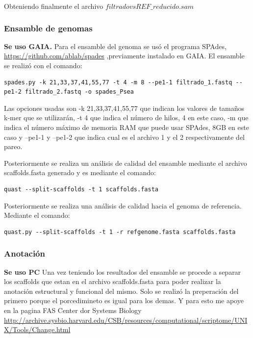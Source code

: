 \documentclass[journal, letterpaper, 11pt]{IEEEtran}
\begin{document}
Obteniendo finalmente el archivo $filtradovsREF\_reducido.sam$ 
\linebreak
\subsubsection{Ensamble de genomas}
\textbf{Se uso GAIA.}
Para el ensamble del genoma se usó el programa SPAdes, \url{https://github.com/ablab/spades} ,previamente instalado en GAIA. El ensamble se realizó con el comando:

\lstset{language=Python,breaklines=true, basicstyle=\footnotesize}
\begin{lstlisting}[frame=single]
spades.py -k 21,33,37,41,55,77 -t 4 -m 8 --pe1-1 filtrado_1.fastq --pe1-2 filtrado_2.fastq -o spades_Psea
\end{lstlisting}

Las opciones usadas son  -k 21,33,37,41,55,77 que indican los valores de tamaños k-mer que se utilizarán, -t 4 que indica el número de hilos, 4 en este caso, -m que indica el número máximo de memoria RAM que puede usar SPAdes, 8GB en este caso y --pe1-1 y --pe1-2 que indica cual es el archivo 1 y el 2 respectivamente del pareo.

Posteriormente se realiza un análisis de calidad del ensamble mediante el archivo scaffolds.fasta generado y es mediante el comando:

\begin{lstlisting}[frame=single]
quast --split-scaffolds -t 1 scaffolds.fasta
\end{lstlisting}

Posteriormente se realiza una análisis de calidad hacia el genoma de referencia. Mediante el comando:

\begin{lstlisting}[frame=single]
quast.py --split-scaffolds -t 1 -r refgenome.fasta scaffolds.fasta
\end{lstlisting}

\subsubsection{Anotación}
\textbf{Se uso PC}
Una vez teniendo los resultados del ensamble se procede a separar los scaffolds que estan en el archivo scaffolds.fasta para poder realizar la anotación estructural y funcional del mismo. Solo se realizó la preperación del primero porque el porcedimineto es igual para los demas. Y para esto me apoye en la pagina FAS Center dor Systems Biology \url{http://archive.sysbio.harvard.edu/CSB/resources/computational/scriptome/UNIX/Tools/Change.html}
\end{document}
